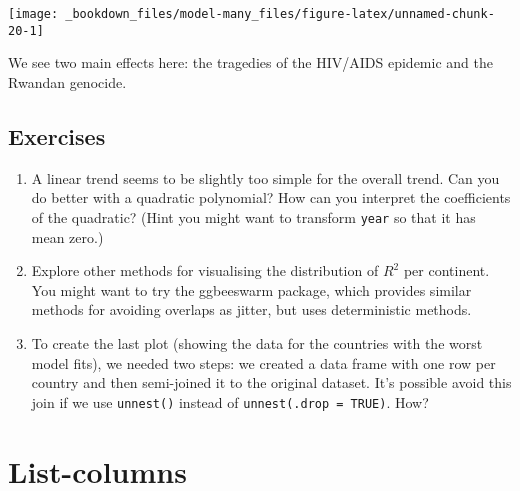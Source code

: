 \documentclass[]{book}
\newenvironment{Shaded}{\begin{snugshade}}{\end{snugshade}}
\newcommand{\KeywordTok}[1]{\textcolor[rgb]{0.13,0.29,0.53}{\textbf{{#1}}}}
\newcommand{\DataTypeTok}[1]{\textcolor[rgb]{0.13,0.29,0.53}{{#1}}}
\newcommand{\FloatTok}[1]{\textcolor[rgb]{0.00,0.00,0.81}{{#1}}}
\newcommand{\StringTok}[1]{\textcolor[rgb]{0.31,0.60,0.02}{{#1}}}
\newcommand{\NormalTok}[1]{{#1}}
\begin{document}
\begin{Shaded}
\end{Shaded}

\begin{center}\texttt{[image: \_bookdown\_files/model-many\_files/figure-latex/unnamed-chunk-20-1]} \end{center}

We see two main effects here: the tragedies of the HIV/AIDS epidemic and
the Rwandan genocide.

\subsection{Exercises}\label{exercises-65}

\begin{enumerate}
\def\labelenumi{\arabic{enumi}.}
\item
  A linear trend seems to be slightly too simple for the overall trend.
  Can you do better with a quadratic polynomial? How can you interpret
  the coefficients of the quadratic? (Hint you might want to transform
  \texttt{year} so that it has mean zero.)
\item
  Explore other methods for visualising the distribution of \(R^2\) per
  continent. You might want to try the ggbeeswarm package, which
  provides similar methods for avoiding overlaps as jitter, but uses
  deterministic methods.
\item
  To create the last plot (showing the data for the countries with the
  worst model fits), we needed two steps: we created a data frame with
  one row per country and then semi-joined it to the original dataset.
  It's possible avoid this join if we use \texttt{unnest()} instead of
  \texttt{unnest(.drop\ =\ TRUE)}. How?
\end{enumerate}

\hypertarget{list-columns-1}{\section{List-columns}\label{list-columns-1}}
\end{document}
